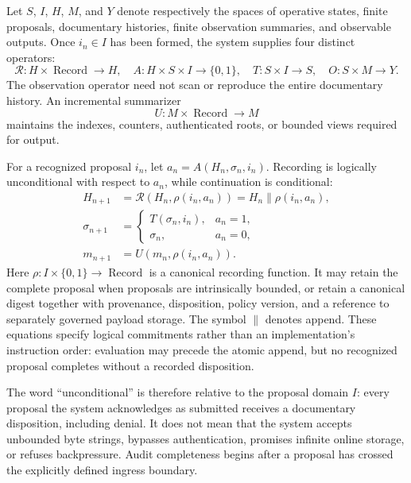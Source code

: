 \documentclass[11pt]{article}
\begin{document}
Let $S$, $I$, $H$, $M$, and $Y$ denote respectively the spaces of operative states, finite proposals, documentary histories, finite observation summaries, and observable outputs. Once $i_n\in I$ has been formed, the system supplies four distinct operators:
\begin{equation}
  \mathcal{R}:H\times\operatorname{Record}\to H,
  \quad A:H\times S\times I\to\{0,1\},
  \quad T:S\times I\to S,
  \quad O:S\times M\to Y.
  \label{eq:operators}
\end{equation}
The observation operator need not scan or reproduce the entire documentary history. An incremental summarizer
\begin{equation}
  U:M\times\operatorname{Record}\to M
  \label{eq:observation-summary}
\end{equation}
maintains the indexes, counters, authenticated roots, or bounded views required for output.

For a recognized proposal $i_n$, let $a_n=A(H_n,\sigma_n,i_n)$. Recording is logically unconditional with respect to $a_n$, while continuation is conditional:
\begin{align}
  H_{n+1} &= \mathcal{R}(H_n,\rho(i_n,a_n))
           = H_n\mathbin{\|}\rho(i_n,a_n),
           \label{eq:record}\\
  \sigma_{n+1} &=
  \begin{cases}
    T(\sigma_n,i_n), & a_n=1,\\
    \sigma_n, & a_n=0,
  \end{cases}
  \label{eq:selective-transition}\\
  m_{n+1} &= U(m_n,\rho(i_n,a_n)).
  \label{eq:summary-update}
\end{align}
Here $\rho:I\times\{0,1\}\to\operatorname{Record}$ is a canonical recording function. It may retain the complete proposal when proposals are intrinsically bounded, or retain a canonical digest together with provenance, disposition, policy version, and a reference to separately governed payload storage. The symbol $\|$ denotes append. These equations specify logical commitments rather than an implementation's instruction order: evaluation may precede the atomic append, but no recognized proposal completes without a recorded disposition.

The word ``unconditional'' is therefore relative to the proposal domain $I$: every proposal the system acknowledges as submitted receives a documentary disposition, including denial. It does not mean that the system accepts unbounded byte strings, bypasses authentication, promises infinite online storage, or refuses backpressure. Audit completeness begins after a proposal has crossed the explicitly defined ingress boundary.
\end{document}
